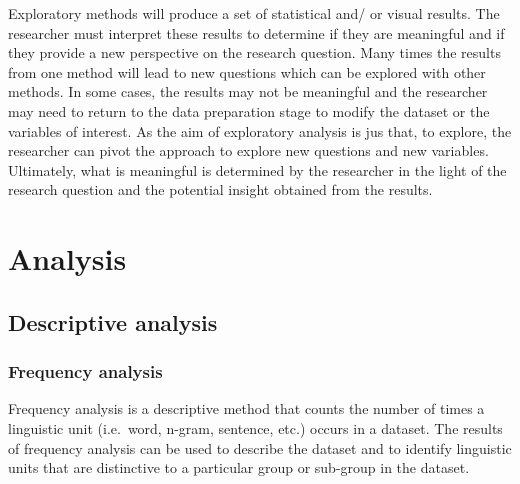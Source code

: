\documentclass[
  letterpaper,
]{scrbook}
\begin{document}
Exploratory methods will produce a set of statistical and/ or visual
results. The researcher must interpret these results to determine if
they are meaningful and if they provide a new perspective on the
research question. Many times the results from one method will lead to
new questions which can be explored with other methods. In some cases,
the results may not be meaningful and the researcher may need to return
to the data preparation stage to modify the dataset or the variables of
interest. As the aim of exploratory analysis is jus that, to explore,
the researcher can pivot the approach to explore new questions and new
variables. Ultimately, what is meaningful is determined by the
researcher in the light of the research question and the potential
insight obtained from the results.

\hypertarget{eda-analysis}{%
\section{Analysis}\label{eda-analysis}}

\hypertarget{eda-descriptive}{%
\subsection{Descriptive analysis}\label{eda-descriptive}}

\hypertarget{eda-frequency}{%
\subsubsection{Frequency analysis}\label{eda-frequency}}

Frequency analysis is a descriptive method that counts the number of
times a linguistic unit (i.e.~word, n-gram, sentence, etc.) occurs in a
dataset. The results of frequency analysis can be used to describe the
dataset and to identify linguistic units that are distinctive to a
particular group or sub-group in the dataset.
\end{document}
